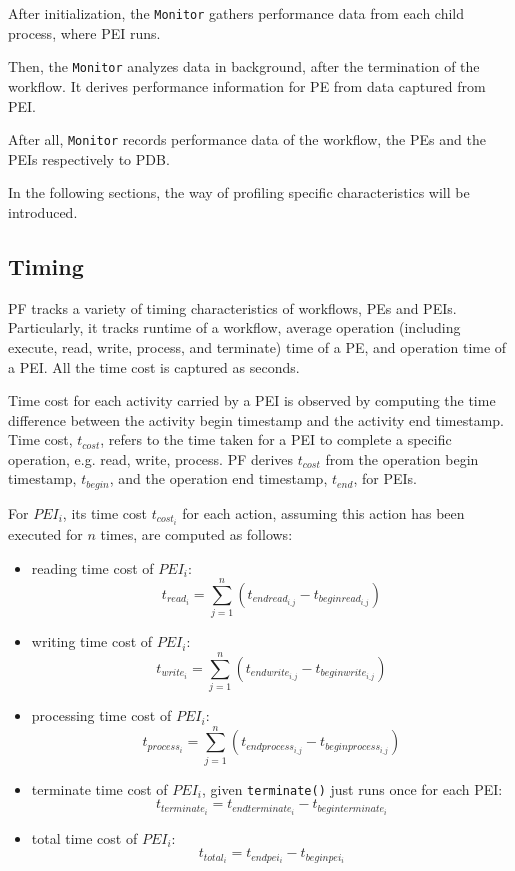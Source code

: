 \documentclass[10pt,twoside,openright,logo]{report}
\begin{document}
After initialization, the \texttt{Monitor} gathers performance data from each child process, where PEI runs.

Then, the \texttt{Monitor} analyzes data in background, after the termination of the workflow. It derives performance information for PE from data captured from PEI.

After all, \texttt{Monitor} records performance data of the workflow, the PEs and the PEIs respectively to PDB.

In the following sections, the way of profiling specific characteristics will be introduced.

\subsection{Timing}
PF tracks a variety of timing characteristics of workflows, PEs and PEIs. Particularly, it tracks runtime of a workflow, average operation (including execute, read, write, process, and terminate) time of a PE, and operation time of a PEI. All the time cost is captured as seconds.

Time cost for each activity carried by a PEI is observed by computing the time difference between the activity begin timestamp and the activity end timestamp.
Time cost, $t_{cost}$, refers to the time taken for a PEI to complete a specific operation, e.g. read, write, process. PF derives $t_{cost}$ from the operation begin timestamp, $t_{begin}$, and the operation end timestamp, $t_{end}$, for PEIs.

For $PEI_i$, its time cost $t_{cost_i}$ for each action, assuming this action has been executed for $n$ times, are computed as follows:

\begin{itemize}
    \item reading time cost of $PEI_i$:
            $$t_{read_i} = \sum\limits^{n}_{j=1}(t_{endread_{i\_j}} - t_{beginread_{i\_j}})$$
    \item writing time cost of $PEI_i$:
            $$t_{write_i} = \sum\limits^{n}_{j=1}(t_{endwrite_{i\_j}} - t_{beginwrite_{i\_j}})$$
    \item processing time cost of $PEI_i$:
            $$t_{process_i} = \sum\limits^{n}_{j=1}(t_{endprocess_{i\_j}} - t_{beginprocess_{i\_j}})$$
    \item terminate time cost of $PEI_i$, given \texttt{terminate()} just runs once for each PEI:
            $$t_{terminate_i} = t_{endterminate_i} - t_{beginterminate_i}$$
     \item total time cost of $PEI_i$:
             $$t_{total_i} = t_{endpei_i} - t_{beginpei_i}$$
\end{itemize}
\end{document}
